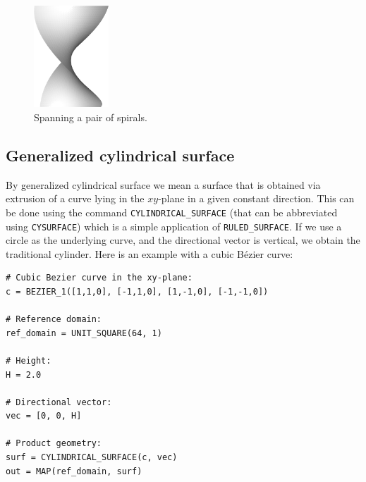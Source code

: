 \begin{figure}[!ht]
\begin{center}
\includegraphics[width=0.25\textwidth]{img/curves-10b.png}
\end{center}
\vspace{-4mm}
\caption{Spanning a pair of spirals.}
\label{fig:curves-10b}
\vspace{-1cm}
\end{figure}
\noindent

\subsection{Generalized cylindrical surface}

By generalized cylindrical surface we mean a surface that is obtained
via extrusion of a curve lying in the $xy$-plane in a given constant 
direction. This can be done using the command {\tt CYLINDRICAL\_SURFACE}
(that can be abbreviated using {\tt CYSURFACE})
which is a simple application of {\tt RULED\_SURFACE}. If we use 
a circle as the underlying curve, and the directional vector is vertical,
we obtain the traditional cylinder. 
Here is an example with a cubic B\'ezier curve:\\

\begin{bbox}
\begin{verbatim}
# Cubic Bezier curve in the xy-plane:
c = BEZIER_1([1,1,0], [-1,1,0], [1,-1,0], [-1,-1,0])

# Reference domain:
ref_domain = UNIT_SQUARE(64, 1)

# Height:
H = 2.0

# Directional vector:
vec = [0, 0, H]

# Product geometry:
surf = CYLINDRICAL_SURFACE(c, vec)
out = MAP(ref_domain, surf)
\end{verbatim}
\end{bbox}
\vspace{6mm}

